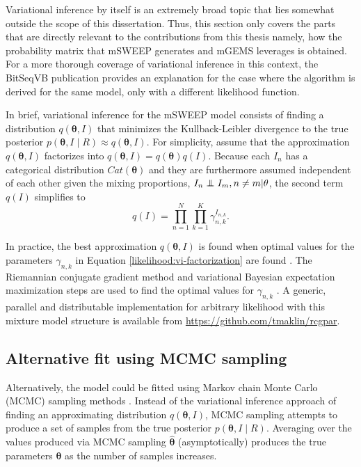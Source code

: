 \documentclass[officiallayout]{tktla}
\newcommand\indept{\protect\mathpalette{\protect\independenT}{\perp}}
\def\independenT#1#2{\mathrel{\rlap{$#1#2$}\mkern2mu{#1#2}}}
\begin{document}
Variational inference by itself is an extremely broad topic that lies
somewhat outside the scope of this dissertation. Thus, this section only
covers the parts that are directly relevant to the contributions from
this thesis \textemdash{ } namely, how the probability matrix that mSWEEP
generates and mGEMS leverages is obtained. For a more thorough
coverage of variational inference in this context, the BitSeqVB publication
\citep{hensman2015fast} provides an explanation for the case where the
algorithm is derived for the same model, only with a different
likelihood function.

In brief, variational inference for the mSWEEP model
\citep{hensman2012fast} consists of finding a distribution
$q\left(\boldsymbol\theta, I\right)$ that minimizes the
Kullback-Leibler divergence to the true posterior
$p\left(\boldsymbol\theta, I \middle| R\right) \approx
q\left(\boldsymbol\theta, I\right)$. For simplicity, assume that the
approximation $q\left(\boldsymbol\theta, I\right)$ factorizes into
$q\left(\boldsymbol\theta, I\right) =
q\left(\boldsymbol\theta\right)q\left(I\right)$. Because each $I_{n}$
has a categorical distribution $Cat\left(\boldsymbol\theta\right)$ and
they are furthermore assumed independent of each other given the
mixing proportions, $I_{n} \indept I_{m}, n \neq m |
\mathbf{\theta}$, the second term $q\left(I\right)$ simplifies to
\begin{equation}
  \label{likelihood:vi-factorization}
  q\left(I\right) = \prod_{n = 1}^N\prod_{k = 1}^K \gamma_{n, k}^{I_{n, k}}.
\end{equation}

In practice, the best approximation $q\left(\boldsymbol\theta,
I\right)$ is found when optimal values for the parameters $\gamma_{n,
  k}$ in Equation \ref{likelihood:vi-factorization} are found
\citep{hensman2015fast}. The Riemannian conjugate gradient
method and variational Bayesian expectation maximization steps are
used to find the optimal values for $\gamma_{n, k}$
\citep{hensman2015fast, hensman2012fast, honkela2010approximate}. A
generic, parallel and distributable implementation for arbitrary
likelihood with this mixture model structure is available from
\url{https://github.com/tmaklin/rcgpar}.

\subsection{Alternative fit using MCMC sampling}
Alternatively, the model could be fitted using Markov chain Monte
Carlo (MCMC) sampling methods \citep{glaus2012identifying}. Instead of
the variational inference approach of finding an approximating
distribution $q\left(\boldsymbol\theta, I\right)$, MCMC sampling
attempts to produce a set of samples from the true posterior
$p\left(\boldsymbol\theta, I\middle| R\right)$. Averaging over the
values produced via MCMC sampling $\hat{\boldsymbol\theta}$
(asymptotically) produces the true parameters $\boldsymbol\theta$ as
the number of samples increases.
\end{document}
